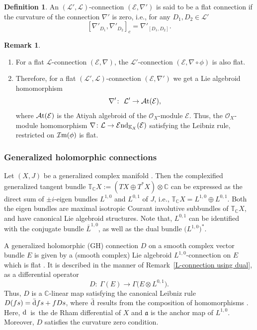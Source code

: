 \documentclass[pdftex]{sigma}
\numberwithin{equation}{section}
\theoremstyle{definition}
\newtheorem{Def}[Thm]{Definition}
\newtheorem{Rem}[Thm]{Remark}
\begin{document}
\begin{Def}
	An $(\mathcal{L}', \mathcal{L})$-connection $(\mathcal{E}, \nabla')$ is said to be a flat connection if the curvature of the connection $\nabla'$ is zero, i.e., for any $D_1, D_2 \in \mathcal{L}'$
\[
[\nabla'_{D_1}, \nabla'_{D_2}]_c= \nabla'_{[D_1,D_2]}.
\]
\end{Def}
	\begin{Rem}\quad
	\begin{enumerate}\itemsep=0pt
		\item For a flat $\mathcal{L}$-connection $(\mathcal{E}, \nabla)$, the $\mathcal{L}'$-connection $(\mathcal{E}, \nabla \circ \phi)$ is also flat.
		\item Therefore, for a flat $(\mathcal{L}', \mathcal{L})$-connection $(\mathcal{E}, \nabla')$ we get a Lie algebroid homomorphism
\[
\nabla'\colon \ \mathcal{L}' \rightarrow \mathcal{A}{\rm t}(\mathcal{E}),
\]
where $\mathcal{A}{\rm t}(\mathcal{E})$ is the Atiyah algebroid of the $\mathcal{O}_X$-module $\mathcal{E}$. Thus, the $\mathcal{O}_X$-module homomorphism $\nabla\colon \mathcal{L} \rightarrow \mathcal{E}{\rm nd}_{\mathbb{K}_X}(\mathcal{E})$ satisfying the Leibniz rule, restricted on $\mathcal{I}{\rm m}(\phi)$ is flat.
\end{enumerate}	
\end{Rem}

\subsubsection{Generalized holomorphic connections}
Let $(X, J)$ be a generalized complex manifold \cite{MG-GC, NH}. Then the complexified generalized tangent bundle $\mathbb{T}_{\mathbb{C}}X:=(TX \oplus T^*X) \otimes \mathbb{C}$ can be expressed as the direct sum of $\pm i$-eigen bundles $L^{1,0}$ and $L^{0,1}$ of $J$, i.e.,
$\mathbb{T}_{\mathbb{C}}X = L^{1,0} \oplus L^{0,1}.$
Both the eigen bundles are maximal isotropic Courant involutive subbundles of $\mathbb{T}_{\mathbb{C}}X$, and have canonical Lie algebroid structures. Note that, $L^{0, 1}$ can be identified with the conjugate bundle $\bar{L}^{1, 0}$, as well as the dual bundle $\bigl(L^{1, 0}\bigr)^*$.

A generalized holomorphic (GH) connection $D$ on a smooth complex vector bundle $E$ is given by a (smooth complex) Lie algebroid $L^{1, 0}$-connection on $E$ which is flat \cite{NH}. It is described in the manner of Remark~\ref{L-connection using dual}, as a differential operator
\[
{D}\colon \ \Gamma(E) \rightarrow \Gamma\bigl(E \otimes L^{0,1} \bigr) .
\]
Thus, $D$ is a $\mathbb{C}$-linear map satisfying the canonical Leibniz rule
$D(f s)= \bar{{\rm d}}f s+ f Ds$, where $\bar{{\rm d}}$ results from the composition of homomorphisms
. Here, ${\rm d}$~is~the de Rham differential of $X$ and $\mathfrak{a}$ is the anchor map of $L^{1,0}$. Moreover, $D$ satisfies the curvature zero condition.
\end{document}
